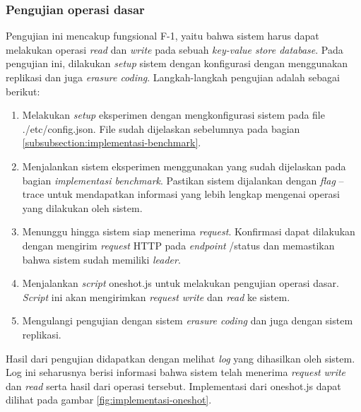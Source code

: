 \subsubsection{Pengujian operasi dasar}
\label{subsubsection:pengujian-operasi-dasar}

Pengujian ini mencakup fungsional F-1, yaitu bahwa sistem harus dapat melakukan operasi \textit{read} dan \textit{write} pada sebuah \textit{key-value store database}. Pada pengujian ini, dilakukan \textit{setup} sistem dengan konfigurasi dengan menggunakan replikasi dan juga \textit{erasure coding}. Langkah-langkah pengujian adalah sebagai berikut:

\begin{enumerate}
  \item Melakukan \textit{setup} eksperimen dengan mengkonfigurasi sistem pada file ./etc/config.json. File sudah dijelaskan sebelumnya pada bagian \ref{subsubsection:implementasi-benchmark}.
  \item Menjalankan sistem eksperimen menggunakan  yang sudah dijelaskan pada bagian \textit{implementasi benchmark}. Pastikan sistem dijalankan dengan \textit{flag} --trace untuk mendapatkan informasi yang lebih lengkap mengenai operasi yang dilakukan oleh sistem.
  \item Menunggu hingga sistem siap menerima \textit{request}. Konfirmasi dapat dilakukan dengan mengirim \textit{request} HTTP pada \textit{endpoint} /status dan memastikan bahwa sistem sudah memiliki \textit{leader}.
  \item Menjalankan \textit{script} oneshot.js untuk melakukan pengujian operasi dasar. \textit{Script} ini akan mengirimkan \textit{request} \textit{write} dan \textit{read} ke sistem.
  \item Mengulangi pengujian dengan sistem \textit{erasure coding} dan juga dengan sistem replikasi.
\end{enumerate}

Hasil dari pengujian didapatkan dengan melihat \textit{log} yang dihasilkan oleh sistem. Log ini seharusnya berisi informasi bahwa sistem telah menerima \textit{request} \textit{write} dan \textit{read} serta hasil dari operasi tersebut. Implementasi dari oneshot.js dapat dilihat pada gambar \ref{fig:implementasi-oneshot}. 


